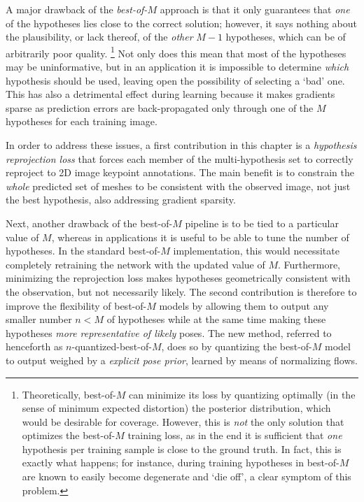 A major drawback of the \emph{best-of-$M$} approach is that it only guarantees that \emph{one} of the hypotheses lies close to the correct solution; however, it says nothing about the plausibility, or lack thereof, of the \emph{other} $M-1$ hypotheses, which can be of arbitrarily poor quality.
\footnote{
Theoretically, best-of-$M$ can minimize its loss by quantizing optimally (in the sense of minimum expected distortion) the posterior distribution, which would be desirable for coverage.
However, this is \emph{not} the only solution that optimizes the best-of-$M$ training loss, as in the end it is sufficient that \emph{one} hypothesis per training sample is close to the ground truth.
In fact, this is exactly what happens; for instance, during training hypotheses in best-of-$M$ are known to easily become degenerate and `die off', a clear symptom of this problem.
}
%
Not only does this mean that most of the hypotheses may be uninformative, but in an application it is impossible to determine \emph{which} hypothesis should be used, leaving open the possibility of selecting a `bad' one.
This has also a detrimental effect during learning because it makes gradients sparse as prediction errors are back-propagated only through one of the $M$ hypotheses for each training image.

In order to address these issues, a first contribution in this chapter is a \emph{hypothesis reprojection loss} that forces each member of the multi-hypothesis set to correctly reproject to 2D image keypoint annotations.
The main benefit is to constrain the \emph{whole} predicted set of meshes to be consistent with the observed image, not just the best hypothesis, also addressing gradient sparsity.

Next, another drawback of the best-of-{$M$} pipeline is to be tied to a particular value of $M$, whereas in applications it is useful to be able to tune the number of hypotheses. In the standard best-of-{$M$} implementation, this would necessitate completely retraining the network with the updated value of $M$. 
Furthermore, minimizing the reprojection loss makes hypotheses geometrically consistent with the observation, but not necessarily likely.
The second contribution is therefore to improve the flexibility of best-of-$M$ models by allowing them to output any smaller number $n<M$ of hypotheses while at the same time making these hypotheses \emph{more representative of likely} poses.
The new method, referred to henceforth as $n$-quantized-best-of-$M$, does so by quantizing the best-of-$M$ model to output weighed by a \emph{explicit pose prior}, learned by means of normalizing flows.

